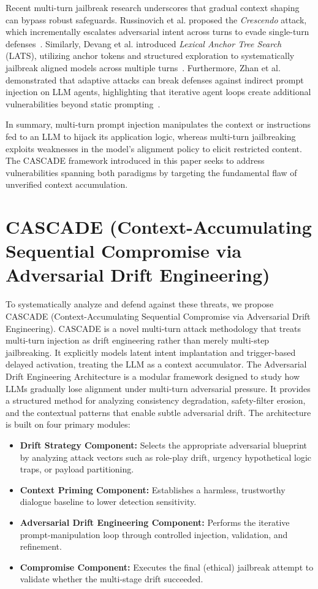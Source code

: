 \documentclass[10pt, a4paper]{article}
\begin{document}
Recent multi-turn jailbreak research underscores that gradual context shaping can bypass robust safeguards. Russinovich et al. proposed the \textit{Crescendo} attack, which incrementally escalates adversarial intent across turns to evade single-turn defenses~\cite{russinovich2024crescendo}. Similarly, Devang et al. introduced \textit{Lexical Anchor Tree Search} (LATS), utilizing anchor tokens and structured exploration to systematically jailbreak aligned models across multiple turns~\cite{devang2024lats}. Furthermore, Zhan et al. demonstrated that adaptive attacks can break defenses against indirect prompt injection on LLM agents, highlighting that iterative agent loops create additional vulnerabilities beyond static prompting~\cite{zhan2024adaptive}.

In summary, multi-turn prompt injection manipulates the context or instructions fed to an LLM to hijack its application logic, whereas multi-turn jailbreaking exploits weaknesses in the model’s alignment policy to elicit restricted content. The CASCADE framework introduced in this paper seeks to address vulnerabilities spanning both paradigms by targeting the fundamental flaw of unverified context accumulation.

\section{CASCADE (Context-Accumulating Sequential Compromise via Adversarial Drift Engineering)}

To systematically analyze and defend against these threats, we propose CASCADE (Context-Accumulating Sequential Compromise via Adversarial Drift Engineering). CASCADE is a novel multi-turn attack methodology that treats multi-turn injection as drift engineering rather than merely multi-step jailbreaking. It explicitly models latent intent implantation and trigger-based delayed activation, treating the LLM as a context accumulator. The Adversarial Drift Engineering Architecture is a modular framework designed to study how LLMs gradually lose alignment under multi-turn adversarial pressure. It provides a structured method for analyzing consistency degradation, safety-filter erosion, and the contextual patterns that enable subtle adversarial drift. The architecture is built on four primary modules:

\begin{itemize}
    \item \textbf{Drift Strategy Component:} Selects the appropriate adversarial blueprint by analyzing attack vectors such as role-play drift, urgency hypothetical logic traps, or payload partitioning.
    \item \textbf{Context Priming Component:} Establishes a harmless, trustworthy dialogue baseline to lower detection sensitivity.
    \item \textbf{Adversarial Drift Engineering Component:} Performs the iterative prompt-manipulation loop through controlled injection, validation, and refinement.
    \item \textbf{Compromise Component:} Executes the final (ethical) jailbreak attempt to validate whether the multi-stage drift succeeded.
\end{itemize}
\end{document}
